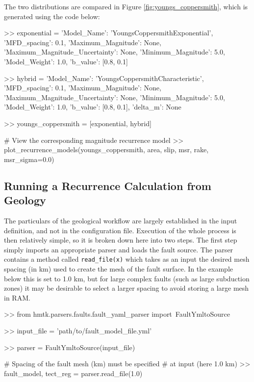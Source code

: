 The two \textcite{YoungsCoppersmith1985} distributions are compared in Figure \ref{fig:youngs_coppersmith}, which is generated using the code below:
\begin{python}[frame=single]
>> exponential = {'Model_Name': 'YoungsCoppersmithExponential',
                  'MFD_spacing': 0.1,
                  'Maximum_Magnitude': None,
                  'Maximum_Magnitude_Uncertainty': None,
                  'Minimum_Magnitude': 5.0,
                  'Model_Weight': 1.0,
                  'b_value': [0.8, 0.1]}

>> hybrid = {'Model_Name': 'YoungsCoppersmithCharacteristic',
             'MFD_spacing': 0.1,
             'Maximum_Magnitude': None,
             'Maximum_Magnitude_Uncertainty': None,
             'Minimum_Magnitude': 5.0,
             'Model_Weight': 1.0,
             'b_value': [0.8, 0.1],
             'delta_m': None}

>> youngs_coppersmith = [exponential, hybrid]

# View the corresponding magnitude recurrence model
>> plot_recurrence_models(youngs_coppersmith,
                          area,
                          slip,
                          msr,
                          rake,
                          msr_sigma=0.0)
\end{python}

\subsection{Running a Recurrence Calculation from Geology}

The particulars of the geological workflow are largely established in the input definition, and not in the configuration file. Execution of the whole process is then relatively simple, so it is broken down here into two steps. The first step simply imports an appropriate parser and loads the fault source. The parser contains a method called \verb=read_file(x)= which takes as an input the desired mesh spacing (in km) used to create the mesh of the fault surface. In the example below this is set to 1.0 km, but for large complex faults (such as large subduction zones) it may be desirable to select a larger spacing to avoid storing a large mesh in RAM.

\begin{python}[frame=single]
>> from hmtk.parsers.faults.fault_yaml_parser import\
    FaultYmltoSource

>> input_file = 'path/to/fault_model_file.yml'

>> parser = FaultYmltoSource(input_file)

# Spacing of the fault mesh (km) must be specified 
# at input (here 1.0 km) 
>> fault_model, tect_reg = parser.read_file(1.0)
\end{python}

